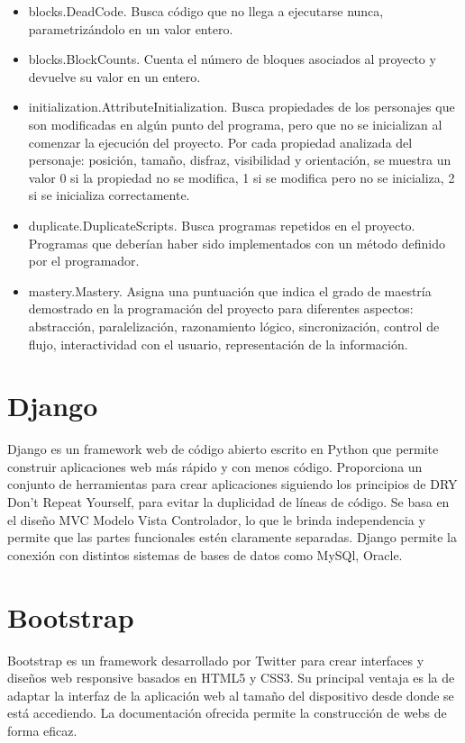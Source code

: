 \documentclass[a4paper, 12pt]{book}
\begin{document}
\begin{itemize}
  \item blocks.DeadCode.
  Busca código que no llega a ejecutarse nunca, parametrizándolo en un valor entero.
  \item blocks.BlockCounts.
  Cuenta el número de bloques asociados al proyecto y devuelve su valor en un entero.
  \item initialization.AttributeInitialization.
  Busca propiedades de los personajes que son modificadas en algún punto del programa,
  pero que no se inicializan al comenzar la 	ejecución del proyecto. Por cada propiedad
  analizada del personaje: posición, tamaño, 	disfraz, visibilidad y orientación, se
  muestra un valor 0 si la propiedad no se modifica, 	1 si se modifica pero no se inicializa,
  2 si se inicializa correctamente.
  \item duplicate.DuplicateScripts.
  Busca programas repetidos en el proyecto. Programas que deberían haber sido implementados
  con un método definido por el programador.
  \item mastery.Mastery.
  Asigna una puntuación que indica el grado de maestría demostrado en la programación del
  proyecto para diferentes aspectos: abstracción, paralelización, razonamiento lógico,
  sincronización, control de flujo, interactividad con el usuario, representación de la información.
	
	
\end{itemize}


\section{Django}
\label{sec:seccion4}
Django es un framework web de código abierto escrito en Python que permite construir aplicaciones
web más rápido y con menos código. Proporciona un conjunto de herramientas para crear aplicaciones
siguiendo los principios de DRY Don't Repeat Yourself, para evitar la duplicidad de líneas de código.
Se basa en el diseño MVC Modelo Vista Controlador, lo que le brinda independencia y permite que
las partes funcionales estén claramente separadas.
Django permite la conexión con distintos sistemas de bases de datos como MySQl, Oracle.



\section{Bootstrap}
\label{sec:seccion5}
Bootstrap es un framework desarrollado por Twitter para crear interfaces y diseños web responsive
basados en HTML5 y CSS3. Su principal ventaja es la de adaptar la interfaz de la aplicación web
al tamaño del dispositivo desde donde se está accediendo. La documentación ofrecida permite la
construcción de webs de forma eficaz.
\end{document}
